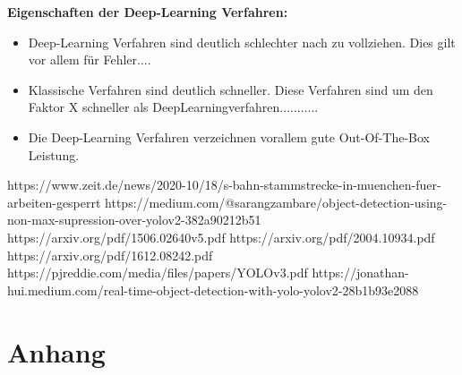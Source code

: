 \documentclass[conference]{IEEEtran}
\begin{document}
	\textbf{Eigenschaften der Deep-Learning Verfahren:}
	\begin{itemize}
		\item Deep-Learning Verfahren sind deutlich schlechter nach zu vollziehen. Dies gilt vor allem für Fehler....
		
		\item Klassische Verfahren sind deutlich schneller. Diese Verfahren sind um den Faktor X schneller als DeepLearningverfahren...........
		
		\item Die Deep-Learning Verfahren verzeichnen vorallem gute Out-Of-The-Box Leistung. 
	\end{itemize}
	
	\begin{thebibliography}{00}
		https://www.zeit.de/news/2020-10/18/s-bahn-stammstrecke-in-muenchen-fuer-arbeiten-gesperrt
		https://medium.com/@sarangzambare/object-detection-using-non-max-supression-over-yolov2-382a90212b51
		https://arxiv.org/pdf/1506.02640v5.pdf
		https://arxiv.org/pdf/2004.10934.pdf %
		https://arxiv.org/pdf/1612.08242.pdf %
		https://pjreddie.com/media/files/papers/YOLOv3.pdf %
		https://jonathan-hui.medium.com/real-time-object-detection-with-yolo-yolov2-28b1b93e2088 %
	\end{thebibliography}
	
	\section{Anhang}
	
\end{document}
